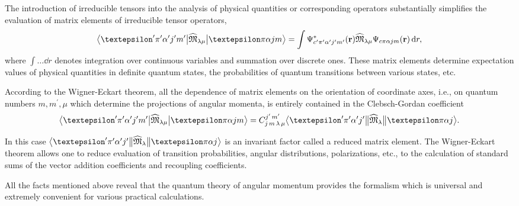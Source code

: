 The introduction of irreducible tensors into the analysis of physical quantities or corresponding operators substantially simplifies the evaluation of matrix elements of irreducible tensor operators,
\begin{equation}
\braOket{\varepsilon^{\prime} \pi^{\prime} \alpha^{\prime} j^{\prime} m^{\prime}}{\widehat{\mathfrak{M}}_{\lambda \mu}}{\varepsilon \pi \alpha j m}=\int \Psi_{c^{\prime} \pi^{\prime} \alpha^{\prime} j^{\prime} m^{\prime}}^{*}(\vect r) \widehat{\mathfrak{M}}_{\lambda \mu} \Psi_{c \pi \alpha j m}(\vect r)\, \dd r,
\end{equation}
where $\int \ldots \dd  r$ denotes integration over continuous variables and summation over discrete ones. These matrix elements determine expectation values of physical quantities in definite quantum states, the probabilities of quantum transitions between various states, etc.

According to the Wigner-Eckart theorem, all the dependence of matrix elements on the orientation of coordinate axes, i.e., on quantum numbers $m, m^{\prime}, \mu$ which determine the projections of angular momenta, is entirely contained in the Clebsch-Gordan coefficient
\begin{equation}
\braOket{\varepsilon^{\prime} \pi^{\prime} \alpha^{\prime} j^{\prime} m^{\prime}}{\widehat{\mathfrak{M}}_{\lambda \mu}}{\varepsilon \pi \alpha j m}=\clebsch{j}{m}{\lambda}{\mu}{j^{\prime}}{m^{\prime}}\braOketred{\varepsilon^{\prime} \pi^{\prime} \alpha^{\prime} j^{\prime}}{\widehat{\mathfrak{M}}_{\lambda}}{\varepsilon \pi \alpha j} .
\end{equation}

In this case $\braOketred{\varepsilon^{\prime} \pi^{\prime} \alpha^{\prime} j^{\prime}}{\widehat{\mathfrak{M}}_{\lambda}}{\varepsilon \pi \alpha j}$ is an invariant factor called a reduced matrix element. The Wigner-Eckart theorem allows one to reduce evaluation of transition probabilities, angular distributions, polarizations, etc., to the calculation of standard sums of the vector addition coefficients and recoupling coefficients.

All the facts mentioned above reveal that the quantum theory of angular momentum provides the formalism which is universal and extremely convenient for various practical calculations.


